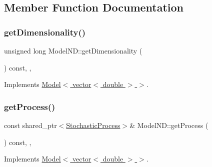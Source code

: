 \subsection{Member Function Documentation}
\hypertarget{class_model_n_d_ab2356536a38f4961257654de629d6093}{}\label{class_model_n_d_ab2356536a38f4961257654de629d6093} 
\subsubsection{\texorpdfstring{get\+Dimensionality()}{getDimensionality()}}
{\footnotesize\ttfamily unsigned long Model\+N\+D\+::get\+Dimensionality (\begin{DoxyParamCaption}{ }\end{DoxyParamCaption}) const\hspace{0.3cm}{\ttfamily [inline]}, {\ttfamily [override]}, {\ttfamily [virtual]}}



Implements \hyperlink{class_model_a26832ec2df24d7941783d3cd6d500898}{Model$<$ vector$<$ double $>$ $>$}.

\hypertarget{class_model_n_d_ae0965f73049004a6634429b96c9190b8}{}\label{class_model_n_d_ae0965f73049004a6634429b96c9190b8} 
\subsubsection{\texorpdfstring{get\+Process()}{getProcess()}\hspace{0.1cm}{\footnotesize\ttfamily [1/2]}}
{\footnotesize\ttfamily const shared\+\_\+ptr$<$\hyperlink{class_stochastic_process}{Stochastic\+Process}$>$\& Model\+N\+D\+::get\+Process (\begin{DoxyParamCaption}{ }\end{DoxyParamCaption}) const\hspace{0.3cm}{\ttfamily [inline]}, {\ttfamily [override]}, {\ttfamily [virtual]}}



Implements \hyperlink{class_model_a6f584114ffcbd4eac04a2bbf8e9cede2}{Model$<$ vector$<$ double $>$ $>$}.

\hypertarget{class_model_n_d_acbbc63ae751cb1b3ad6f045fb42b6ac3}{}\label{class_model_n_d_acbbc63ae751cb1b3ad6f045fb42b6ac3} 
